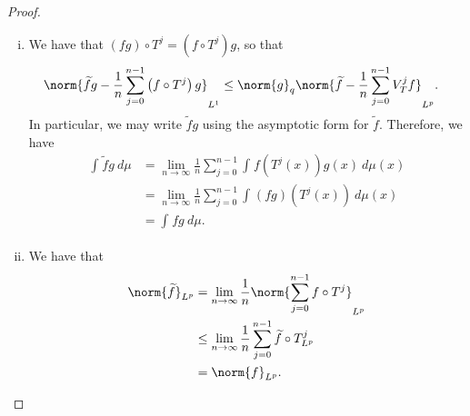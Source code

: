 \documentclass[10pt]{mypackage}
\begin{document}
\begin{proof}
\begin{enumerate}[(i)]
      If $1\leq p \leq 2$, we have that
      \begin{align*}
        \norm{\frac{1}{n}\sum_{j=0}^{n-1}V_T^{j}f - Pf}_{L^p} &\leq \norm{\frac{1}{n}\sum_{j=0}^{n-1}V_T^{j}f - Pf}_{L^2}\\
                                                              &\rightarrow 0.
      \end{align*}
      If $p\geq 2$, then
      \begin{align*}
        \norm{\frac{1}{n}\sum_{j=0}^{n-1}V_T^{j}f - Pf}_{L^p}^{p} &\leq 2\norm{f}_{L^{\infty}}^{p-2} \norm{\frac{1}{n}\sum_{j=0}^{n-1}V_T^{j}f - Pf}_{L^2}^2\\
                                                                  &\rightarrow 0.
      \end{align*}
    \item We have that $\left( fg \right)\circ T^{j} = \left( f\circ T^{j} \right)g$, so that
      \begin{align*}
        \norm{ \widetilde{f}g - \frac{1}{n}\sum_{j=0}^{n-1}\left( f\circ T^{j} \right)g }_{L^1} &\leq \norm{g}_{q} \norm{ \widetilde{f} - \frac{1}{n}\sum_{j=0}^{n-1}V_T^{j}f }_{L^p}.
      \end{align*}
      In particular, we may write $\widetilde{f}g$ using the asymptotic form for $\widetilde{f}$. Therefore, we have
      \begin{align*}
        \int_{}^{} \widetilde{f}g\:d\mu &= \lim_{n\rightarrow\infty} \frac{1}{n}\sum_{j=0}^{n-1} \int_{}^{} f\left( T^{j}(x) \right)g(x)\:d\mu(x)\\
                                        &= \lim_{n\rightarrow\infty} \frac{1}{n}\sum_{j=0}^{n-1} \int_{}^{} \left( fg \right)\left( T^{j}(x) \right)\:d\mu(x)\\
                                        &= \int_{}^{} fg\:d\mu.
      \end{align*}
    \item We have that
      \begin{align*}
        \norm{\widetilde{f}}_{L^p} &= \lim_{n\rightarrow\infty} \frac{1}{n}\norm{\sum_{j=0}^{n-1}f\circ T^{j}}_{L^p}\\
                                   &\leq \lim_{n\rightarrow\infty}\frac{1}{n}\sum_{j=0}^{n-1} \widetilde{f}\circ T^{j}_{L^p}\\
                                   &= \norm{f}_{L^p}.
      \end{align*}
  \end{enumerate}
\end{proof}
\end{document}
